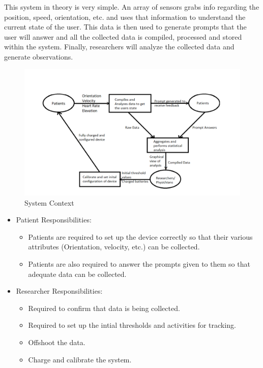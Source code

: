 \documentclass[12pt]{article}
\begin{document}
This system in theory is very simple. An array of sensors grabs info regarding the position, speed, orientation, etc. and uses that information to understand the current state of the user. This data is then used to generate prompts that the user will answer and all the collected data is compiled, processed and stored within the system. Finally, researchers will analyze the collected data and generate observations. 
\begin{figure}[h!]

\begin{center}
 \includegraphics[width=.95\textwidth]{System Context Diagram}
\caption{System Context}
\label{Fig_SystemContext} 
\end{center}
\end{figure}


\begin{itemize}

\item Patient Responsibilities:
\begin{itemize}
\item Patients are required to set up the device correctly so that their various attributes (Orientation, velocity, etc.) can be collected.
\item Patients are also required to answer the prompts given to them so that adequate data can be collected.
\end{itemize}
\item Researcher Responsibilities:
\begin{itemize}
\item Required to confirm that data is being collected.
\item Required to set up the intial thresholds and activities for tracking.
\item Offshoot the data.
\item Charge and calibrate the system.
\end{itemize}
\end{itemize}
\end{document}
